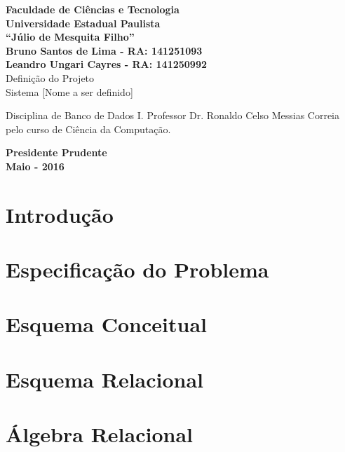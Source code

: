 \documentclass[12pt, onecolumn, titlepage]{article}
\begin{document}

\begin{titlepage} %
	
	\vfill
	\begin{center}
	
		{\large \textbf{Faculdade de Ciências e Tecnologia\\Universidade Estadual Paulista\\``Júlio de Mesquita Filho''}} \\[3cm]
		{\large \textbf{Bruno Santos de Lima - RA: 141251093}}\\
		{\large \textbf{Leandro Ungari Cayres - RA: 141250992}}\\[3cm]
		{\Large Definição do Projeto}\\
		{\Large Sistema [Nome a ser definido]}\\[3cm]

	\hspace{.45\textwidth} %
	\begin{minipage}{.5\textwidth}
		\large Disciplina de Banco de Dados I. Professor Dr. Ronaldo Celso Messias Correia pelo curso de Ciência da Computação.\\[0.5cm]
	\end{minipage}

	\vfill
	\vspace{1.5cm}
	
	\large \textbf{Presidente Prudente\\}
	\large \textbf{Maio - 2016}
	
	\end{center}
	
\end{titlepage}
\newpage

\renewcommand{\contentsname}{Índice}
\tableofcontents

\newpage

\section{Introdução}
\label{sect:introducao}


\section{Especificação do Problema}
\label{sect:especificacao}


\section{Esquema Conceitual}
\label{sect:conceitual}


\section{Esquema Relacional}
\label{sect:relacional}


\section{Álgebra Relacional}
\label{sect:algebra}
\end{document}
